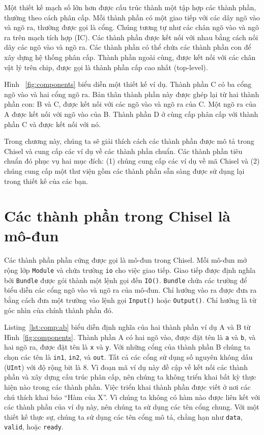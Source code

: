 \documentclass[%
    10pt,
    headinclude, footexclude,
    openright, %
    notitlepage,
    cleardoubleempty,
    headsepline,
    pointlessnumbers,
    bibtotoc, idxtotoc,
    ]{scrbook}
\newcommand{\code}[1]{{\small{\texttt{#1}}}}
\begin{document}
Một thiết kế mạch số lớn hơn được cấu trúc thành một tập hợp các thành phần, thường theo 
cách phân cấp. Mỗi thành phần có một giao tiếp với các dây ngõ vào và ngõ ra, thường được gọi là cổng. 
Chúng tương tự như các chân ngõ vào và ngõ ra trên mạch tích hợp (IC).
Các thành phần được kết nối với nhau bằng cách nối dây các ngõ vào và ngõ ra. 
Các thành phần có thể chứa các thành phần con để xây dựng hệ thống phân cấp.
Thành phần ngoài cùng, được kết nối với các chân vật lý trên chip, được gọi là thành phần cấp cao nhất (top-level).

Hình ~\ref{fig:components} biểu diễn một thiết kế ví dụ. Thành phần C có 
ba cổng ngõ vào và hai cổng ngõ ra. Bản thân thành phần này được ghép lại từ 
hai thành phần con: B và C, được kết nối với các ngõ vào và ngõ ra của C. 
Một ngõ ra của A được kết nối với ngõ vào của B. Thành phần D ở cùng cấp 
phân cấp với thành phần C và được kết nối với nó.

Trong chương này, chúng ta sẽ giải thích cách các thành phần được mô tả trong Chisel và 
cung cấp các ví dụ về các thành phần chuẩn. Các thành phần tiêu chuẩn đó phục vụ hai 
mục đích: (1) chúng cung cấp các ví dụ về mã Chisel và (2) chúng cung cấp một thư viện 
gồm các thành phần sẵn sàng được sử dụng lại trong thiết kế của các bạn.

\section{Các thành phần trong Chisel là mô-đun}


Các thành phần phần cứng được gọi là mô-đun trong Chisel. Mỗi mô-đun  mở rộng
lớp \code{Module} và chứa trường \code{io} cho việc giao tiếp.
Giao tiếp được định nghĩa bởi \code{Bundle} được gói thành một lệnh gọi đến \code{IO()}.
\code{Bundle} chứa các trường để biểu diễn các cổng ngõ vào và ngõ ra của mô-đun. 
Chỉ hướng vào ra được đưa ra bằng cách đưa một trường vào lệnh gọi \code{Input()} hoặc
\code{Output()}. Chỉ hướng là từ góc nhìn của chính thành phần đó.



Listing~\ref{lst:comp:ab} biểu diễn định nghĩa của hai thành phần ví dụ A và B từ
Hình~\ref{fig:components}.
Thành phần A có hai ngõ vào, được đặt tên là \code{a} và \code{b}, và hai
ngõ ra, được đặt tên là \code{x} và \code{y}. Với những cổng của thành phần B
chúng ta chọn các tên là \code{in1}, \code{in2}, và \code{out}.
Tất cả các cổng sử dụng số nguyên không dấu (\code{UInt}) với độ rộng bit là 8.
Vì đoạn mã ví dụ này đề cập về kết nối các thành phần và xây dựng cấu trúc phân cấp, 
nên chúng ta không triển khai bất kỳ thực hiện nào trong các thành phần.
Việc triển khai thành phần được viết ở nơi các chú thích khai báo ``Hàm của X''.
Vì chúng ta không có hàm nào được liên kết với các thành phần của ví dụ này,
nên chúng ta sử dụng các tên cổng chung. Với một thiết kế thực sự, chúng ta sử dụng
các tên cổng mô tả, chẳng hạn như \code{data}, \code{valid}, hoặc \code{ready}.
\end{document}
